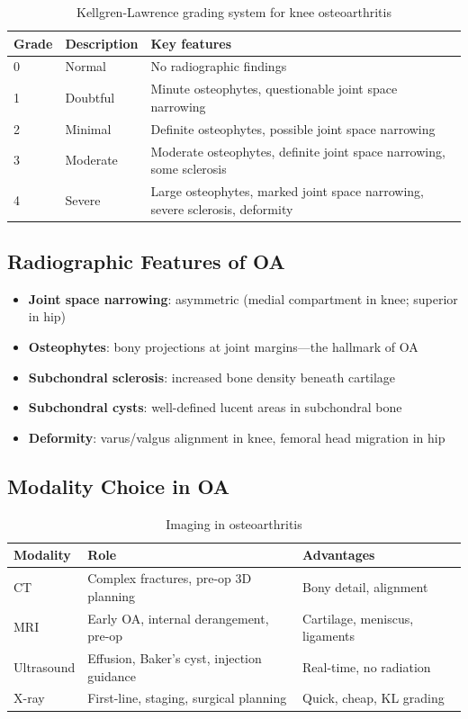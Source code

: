 \begin{table}[h]
\centering
\caption{Kellgren-Lawrence grading system for knee osteoarthritis}
\begin{tabular}{|p{}|p{}|p{}|}
\hline
\textbf{Grade} & \textbf{Description} & \textbf{Key features} \\
\hline
0 & Normal & No radiographic findings \\
1 & Doubtful & Minute osteophytes, questionable joint space narrowing \\
2 & Minimal & Definite osteophytes, possible joint space narrowing \\
3 & Moderate & Moderate osteophytes, definite joint space narrowing, some sclerosis \\
4 & Severe & Large osteophytes, marked joint space narrowing, severe sclerosis, deformity \\
\hline
\end{tabular}
\end{table}

\subsection{Radiographic Features of OA}
\begin{itemize}
  \item \textbf{Joint space narrowing}: asymmetric (medial compartment in knee; superior in hip)
  \item \textbf{Osteophytes}: bony projections at joint margins---the hallmark of OA
  \item \textbf{Subchondral sclerosis}: increased bone density beneath cartilage
  \item \textbf{Subchondral cysts}: well-defined lucent areas in subchondral bone
  \item \textbf{Deformity}: varus/valgus alignment in knee, femoral head migration in hip
\end{itemize}

\subsection{Modality Choice in OA}
\begin{table}[h]
\centering
\caption{Imaging in osteoarthritis}
\begin{tabular}{|p{}|p{}|p{}|}
\hline
\textbf{Modality} & \textbf{Role} & \textbf{Advantages} \\
\hline
CT & Complex fractures, pre-op 3D planning & Bony detail, alignment \\
MRI & Early OA, internal derangement, pre-op & Cartilage, meniscus, ligaments \\
Ultrasound & Effusion, Baker's cyst, injection guidance & Real-time, no radiation \\
X-ray & First-line, staging, surgical planning & Quick, cheap, KL grading \\
\hline
\end{tabular}
\end{table}


